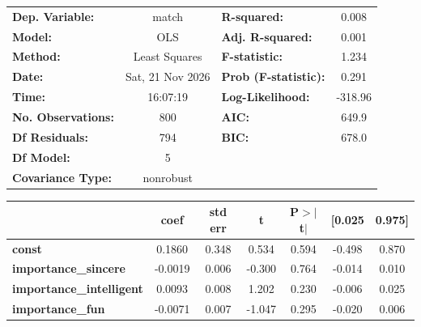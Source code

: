 \begin{table}[htbp]
\centering
\scriptsize
\begin{center}
\begin{tabular}{lclc}
\toprule
\textbf{Dep. Variable:}                &      match       & \textbf{  R-squared:         } &     0.008   \\
\textbf{Model:}                        &       OLS        & \textbf{  Adj. R-squared:    } &     0.001   \\
\textbf{Method:}                       &  Least Squares   & \textbf{  F-statistic:       } &     1.234   \\
\textbf{Date:}                         & Sat, 21 Nov 2026 & \textbf{  Prob (F-statistic):} &    0.291    \\
\textbf{Time:}                         &     16:07:19     & \textbf{  Log-Likelihood:    } &   -318.96   \\
\textbf{No. Observations:}             &         800      & \textbf{  AIC:               } &     649.9   \\
\textbf{Df Residuals:}                 &         794      & \textbf{  BIC:               } &     678.0   \\
\textbf{Df Model:}                     &           5      & \textbf{                     } &             \\
\textbf{Covariance Type:}              &    nonrobust     & \textbf{                     } &             \\
\bottomrule
\end{tabular}
\begin{tabular}{lcccccc}
                                       & \textbf{coef} & \textbf{std err} & \textbf{t} & \textbf{P$> |$t$|$} & \textbf{[0.025} & \textbf{0.975]}  \\
\midrule
\textbf{const}                         &       0.1860  &        0.348     &     0.534  &         0.594        &       -0.498    &        0.870     \\
\textbf{importance\_sincere}           &      -0.0019  &        0.006     &    -0.300  &         0.764        &       -0.014    &        0.010     \\
\textbf{importance\_intelligent}       &       0.0093  &        0.008     &     1.202  &         0.230        &       -0.006    &        0.025     \\
\textbf{importance\_fun}               &      -0.0071  &        0.007     &    -1.047  &         0.295        &       -0.020    &        0.006     \\

\end{tabular}
\end{center}
\end{table}
